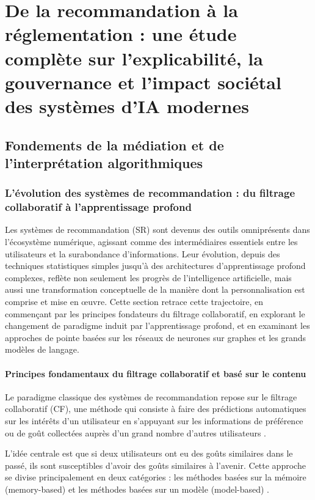 \part{De la recommandation à la réglementation : une étude complète sur l'explicabilité, la gouvernance et l'impact sociétal des systèmes d'IA modernes}
\chapter{Fondements de la médiation et de l'interprétation algorithmiques}
\section{L'évolution des systèmes de recommandation : du filtrage collaboratif à l'apprentissage profond}
Les systèmes de recommandation (SR) sont devenus des outils omniprésents dans l'écosystème numérique, agissant comme des intermédiaires essentiels entre les utilisateurs et la surabondance d'informations. Leur évolution, depuis des techniques statistiques simples jusqu'à des architectures d'apprentissage profond complexes, reflète non seulement les progrès de l'intelligence artificielle, mais aussi une transformation conceptuelle de la manière dont la personnalisation est comprise et mise en œuvre. Cette section retrace cette trajectoire, en commençant par les principes fondateurs du filtrage collaboratif, en explorant le changement de paradigme induit par l'apprentissage profond, et en examinant les approches de pointe basées sur les réseaux de neurones sur graphes et les grands modèles de langage.
\subsection{Principes fondamentaux du filtrage collaboratif et basé sur le contenu}
Le paradigme classique des systèmes de recommandation repose sur le filtrage collaboratif (CF), une méthode qui consiste à faire des prédictions automatiques sur les intérêts d'un utilisateur en s'appuyant sur les informations de préférence ou de goût collectées auprès d'un grand nombre d'autres utilisateurs \citet{Sarwar2001, Adomavicius2005}. 

L'idée centrale est que si deux utilisateurs ont eu des goûts similaires dans le passé, ils sont susceptibles d'avoir des goûts similaires à l'avenir. Cette approche se divise principalement en deux catégories : les méthodes basées sur la mémoire (memory-based) et les méthodes basées sur un modèle (model-based) \citet{Su2009}.

